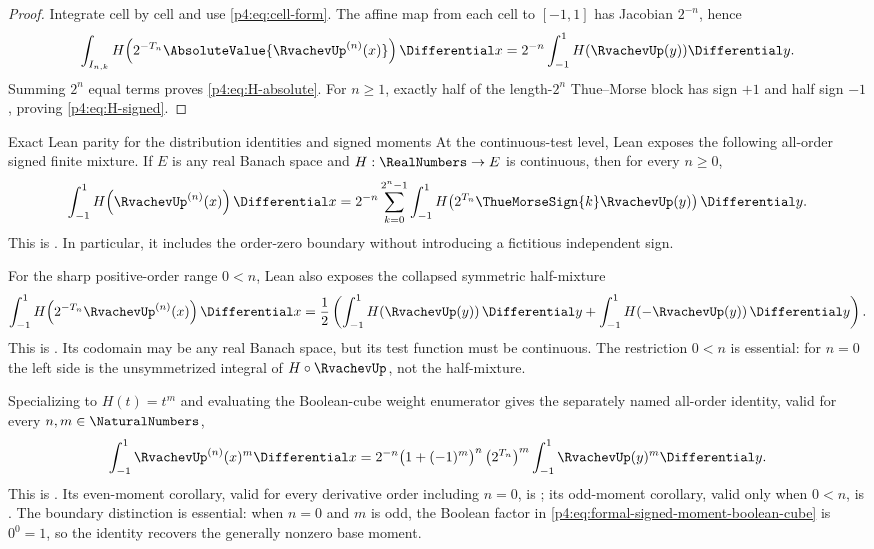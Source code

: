 \documentclass[11pt,oneside]{article}
\theoremstyle{definition}
\theoremstyle{remark}
\begin{document}
\begin{proof}
Integrate cell by cell and use \eqref{p4:eq:cell-form}.  The affine map from each cell to
$[-1,1]$ has Jacobian $2^{-n}$, hence
\[
 \int_{I_{n,k}}H\!\left(2^{-T_n}\AbsoluteValue{\RvachevUp^{(n)}(x)}\right)\Differential x
 =2^{-n}\int_{-1}^{1}H(\RvachevUp(y))\Differential y.
\]
Summing $2^n$ equal terms proves \eqref{p4:eq:H-absolute}.  For $n\geq1$, exactly half of the
length-$2^n$ Thue--Morse block has sign $+1$ and half sign $-1$, proving
\eqref{p4:eq:H-signed}.
\end{proof}

\begin{statusbox}{Exact Lean parity for the distribution identities and signed moments}
At the continuous-test level, Lean exposes the following all-order signed finite mixture.
If \(E\) is any real Banach space and
\(H:\RealNumbers\to E\) is continuous, then for every \(n\ge0\),
\begin{equation}
 \int_{-1}^{1}H\!\left(\RvachevUp^{(n)}(x)\right)\Differential x
 =
 2^{-n}\sum_{k=0}^{2^n-1}
 \int_{-1}^{1}H\!\left(2^{T_n}\ThueMorseSign{k}\RvachevUp(y)\right)\Differential y.
 \label{p4:eq:formal-signed-finite-mixture}
\end{equation}
This is .  In particular, it includes the
order-zero boundary without introducing a fictitious independent sign.

For the sharp positive-order range \(0<n\), Lean also exposes the collapsed symmetric
half-mixture
\begin{equation}
 \int_{-1}^{1}H\!\left(2^{-T_n}\RvachevUp^{(n)}(x)\right)\Differential x
 =\frac12\left(
   \int_{-1}^{1}H\!\left(\RvachevUp(y)\right)\Differential y
   +\int_{-1}^{1}H\!\left(-\RvachevUp(y)\right)\Differential y\right).
 \label{p4:eq:formal-normalized-signed-test}
\end{equation}
This is .  Its codomain may be
any real Banach space, but its test function must be continuous.  The restriction \(0<n\)
is essential: for \(n=0\) the left side is the unsymmetrized integral of
\(H\circ\RvachevUp\), not the half-mixture.

Specializing to \(H(t)=t^m\) and evaluating the Boolean-cube weight enumerator gives the
separately named all-order identity, valid for every \(n,m\in\NaturalNumbers\),
\begin{equation}
 \int_{-1}^{1}\RvachevUp^{(n)}(x)^m\Differential x
 =2^{-n}\bigl(1+(-1)^m\bigr)^n
   \left(2^{T_n}\right)^m
   \int_{-1}^{1}\RvachevUp(y)^m\Differential y.
 \label{p4:eq:formal-signed-moment-boolean-cube}
\end{equation}
This is .  Its even-moment corollary,
valid for every derivative order including \(n=0\), is
; its odd-moment corollary,
valid only when \(0<n\), is
.  The boundary distinction
is essential: when \(n=0\) and \(m\) is odd, the Boolean factor in
\eqref{p4:eq:formal-signed-moment-boolean-cube} is \(0^0=1\), so the identity recovers the
generally nonzero base moment.


\end{statusbox}
\end{document}
